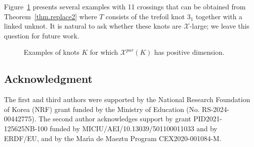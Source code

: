 \documentclass[12pt,reqno]{amsart}
\theoremstyle{definition}
\def\calX{\mathcal X}
\begin{document}
Figure~\ref{fig.11a43} presents several examples with 11 crossings that can be obtained from Theorem~\ref{thm.replace2} where $T$ consists of the trefoil knot $3_1$ together with a linked unknot. It is natural to ask whether these knots are $\calX$-large; we leave this question for future work.

\begin{figure}[!htbp]
    \centering
    \scalebox{0.9}{}
    \caption{Examples of knots $K$ for which $\calX^{par}(K)$ has positive dimension.}
    \label{fig.11a43}
\end{figure}

\subsection*{Acknowledgment}
The first and third authors were supported by the National Research Foundation of Korea (NRF) grant funded by the Ministry of Education (No. RS-2024-00442775).
The second author acknowledges support by grant PID2021-125625NB-100 funded by MICIU/AEI/10.13039/501100011033 and by ERDF/EU,  and by the
Mar\'\i a de Maeztu Program CEX2020-001084-M.






\end{document}
